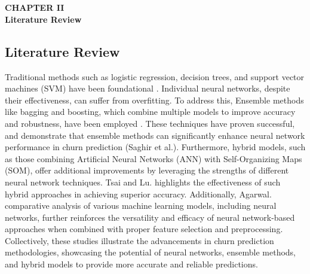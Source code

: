 \section*{}
\begin{center}
    {\fontsize{14}{1.5}\selectfont \textbf{CHAPTER II}}\\
    \vspace{12pt}
    {\fontsize{16}{1.5}\selectfont \textbf{Literature Review}}\\
    \vspace{12pt}
    \vspace{12pt}
\end{center}
\setcounter{section}{2}
\setcounter{subsection}{0}
\renewcommand{\theequation}{\thesection.\arabic{equation}}
\renewcommand{\thetable}{\thesection.\arabic{table}}
\renewcommand{\thefigure}{\thesection.\arabic{figure}}
\setcounter{table}{0}
\setcounter{figure}{0}
\setcounter{equation}{0}

\subsection{Literature Review} {
 Traditional methods such as logistic regression, decision trees, and support vector machines (SVM) have been foundational \cite{Agrawal2018}. Individual neural networks, despite their effectiveness, can suffer from overfitting. 
 To address this, Ensemble methods like bagging and boosting, which combine multiple models to improve accuracy and robustness, have been employed \cite{8667113}. These techniques have proven successful, and demonstrate that ensemble methods can significantly enhance neural network performance in churn prediction (Saghir et al.). 
 Furthermore, hybrid models, such as those combining Artificial Neural Networks (ANN) with Self-Organizing Maps (SOM), offer additional improvements by leveraging the strengths of different neural network techniques\cite{TSAI200912547}. Tsai and Lu. highlights the effectiveness of such hybrid approaches in achieving superior accuracy. 
 Additionally, Agarwal. comparative analysis of various machine learning models, including neural networks, further reinforces the versatility and efficacy of neural network-based approaches when combined with proper feature selection and preprocessing\cite{Agarwal2022-cq}. 
 Collectively, these studies illustrate the advancements in churn prediction methodologies, showcasing the potential of neural networks, ensemble methods, and hybrid models to provide more accurate and reliable predictions.
}